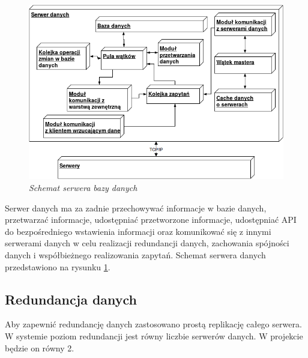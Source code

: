 \begin{figure}[!h]
    \begin{center}
    \includegraphics[angle=0,scale=0.5]{img/data_serv.png}
    \end{center}
    \caption{\em Schemat serwera bazy danych}
    \label{fig:db}
\end{figure}

Serwer danych ma za zadnie przechowywać informacje w bazie danych, przetwarzać informacje, udostępniać przetworzone informacje, udostępniać API do bezpośredniego wstawienia informacji oraz komunikować się z innymi serwerami danych w celu realizacji redundancji danych, zachowania spójności danych i współbieżnego realizowania zapytań. Schemat serwera danych przedstawiono na rysunku \ref{fig:db}.

\subsection{Redundancja danych}
Aby zapewnić redundancję danych zastosowano prostą replikację całego serwera. W systemie poziom redundancji jest równy liczbie serwerów danych. W projekcie będzie on równy 2.
